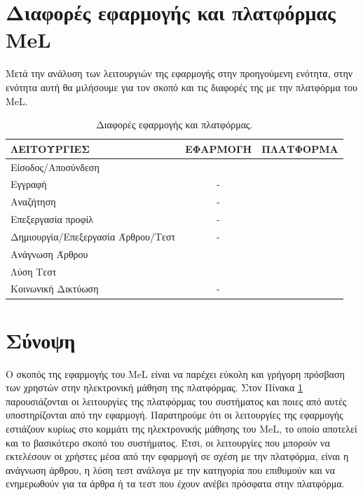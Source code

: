 \section{Διαφορές εφαρμογής και πλατφόρμας \textlatin{MeL}}

Μετά την ανάλυση των λειτουργιών της εφαρμογής στην προηγούμενη ενότητα, στην ενότητα αυτή θα μιλήσουμε για τον σκοπό και τις διαφορές της με την πλατφόρμα του \textlatin{MeL}.

\begin{table}[t]
\centering
\begin{tabular}{|l||c|c|}
	\hline\rowcolor{gray} 
	ΛΕΙΤΟΥΡΓΙΕΣ & ΕΦΑΡΜΟΓΗ & ΠΛΑΤΦΟΡΜΑ \\
	\hline\hline
	Είσοδος/Αποσύνδεση &\checkmark & \checkmark \\
	Εγγραφή & - & \checkmark \\
	Αναζήτηση & - & \checkmark \\
	Επεξεργασία προφίλ & - & \checkmark \\
	Δημιουργία/Επεξεργασία Άρθρου/Τεστ & - & \checkmark \\
	Ανάγνωση Άρθρου & \checkmark & \checkmark \\
	Λύση Τεστ & \checkmark & \checkmark \\
	Κοινωνική Δικτύωση & - & \checkmark \\
	\hline
\end{tabular}
\caption{Διαφορές εφαρμογής και πλατφόρμας.}
\label{table:app_web}
\end{table}


\section{Σύνοψη}

Ο σκοπός της εφαρμογής του \textlatin{MeL} είναι να παρέχει εύκολη και γρήγορη πρόσβαση των χρηστών στην ηλεκτρονική μάθηση της πλατφόρμας. Στον Πίνακα \ref{table:app_web} παρουσιάζονται οι λειτουργίες της πλατφόρμας του συστήματος και ποιες από αυτές υποστηρίζονται από την εφαρμογή. Παρατηρούμε ότι οι λειτουργίες της εφαρμογής εστιάζουν κυρίως στο κομμάτι της ηλεκτρονικής μάθησης του \textlatin{MeL}, το οποίο αποτελεί και το βασικότερο σκοπό του συστήματος. Έτσι, οι λειτουργίες που μπορούν να εκτελέσουν οι χρήστες μέσα από την εφαρμογή σε σχέση με την πλατφόρμα, είναι η ανάγνωση άρθρου, η λύση τεστ ανάλογα με την κατηγορία που επιθυμούν και να ενημερωθούν για τα άρθρα ή τα τεστ που έχουν ανέβει πρόσφατα στην πλατφόρμα.







